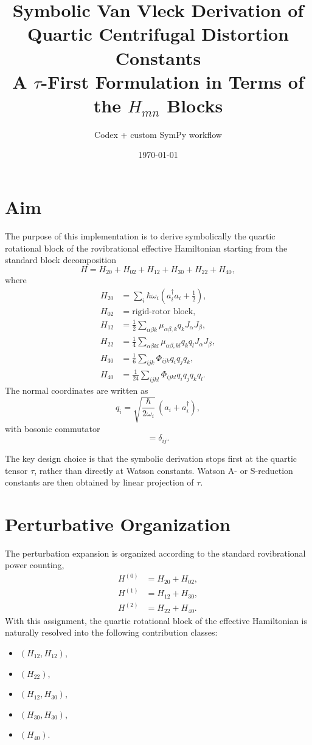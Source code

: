 \documentclass[11pt,a4paper]{article}
\title{Symbolic Van Vleck Derivation of Quartic Centrifugal Distortion Constants\\
\large A $\tau$-First Formulation in Terms of the $H_{mn}$ Blocks}
\author{Codex + custom SymPy workflow}
\date{\today}
\begin{document}
\maketitle

\section{Aim}
The purpose of this implementation is to derive symbolically the quartic rotational block
of the rovibrational effective Hamiltonian starting from the standard block decomposition
\begin{equation}
H = H_{20} + H_{02} + H_{12} + H_{30} + H_{22} + H_{40},
\end{equation}
where
\begin{align}
H_{20} &= \sum_i \hbar\omega_i\left(a_i^\dagger a_i + \frac12\right),\\
H_{02} &= \text{rigid-rotor block},\\
H_{12} &= \frac12 \sum_{\alpha\beta k} \mu_{\alpha\beta,k} q_k J_\alpha J_\beta,\\
H_{22} &= \frac14 \sum_{\alpha\beta kl} \mu_{\alpha\beta,kl} q_k q_l J_\alpha J_\beta,\\
H_{30} &= \frac16 \sum_{ijk} \Phi_{ijk} q_i q_j q_k,\\
H_{40} &= \frac1{24} \sum_{ijkl} \Phi_{ijkl} q_i q_j q_k q_l.
\end{align}
The normal coordinates are written as
\begin{equation}
q_i = \sqrt{\frac{\hbar}{2\omega_i}}\,(a_i + a_i^\dagger),
\end{equation}
with bosonic commutator
\begin{equation}
[a_i,a_j^\dagger]=\delta_{ij}.
\end{equation}

The key design choice is that the symbolic derivation stops first at the quartic tensor
\(\tau\), rather than directly at Watson constants. Watson A- or S-reduction constants are
then obtained by linear projection of \(\tau\).

\section{Perturbative Organization}
The perturbation expansion is organized according to the standard rovibrational power counting,
\begin{align}
H^{(0)} &= H_{20} + H_{02},\\
H^{(1)} &= H_{12} + H_{30},\\
H^{(2)} &= H_{22} + H_{40}.
\end{align}
With this assignment, the quartic rotational block of the effective Hamiltonian is naturally
resolved into the following contribution classes:
\begin{itemize}
\item \((H_{12},H_{12})\),
\item \((H_{22})\),
\item \((H_{12},H_{30})\),
\item \((H_{30},H_{30})\),
\item \((H_{40})\).
\end{itemize}
\end{document}
